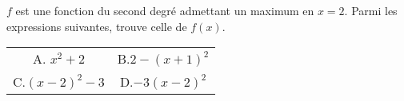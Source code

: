 
$f$ est une fonction du second degré admettant un maximum en $x=2$. Parmi les expressions suivantes, trouve celle de $f(x)$.

\begin{tabular}{cc}
A. $x^2+2$ & B.$2-(x+1)^2$  \\ 
C.$(x-2)^2-3$ & D.$-3(x-2)^2$ \\ 
\end{tabular} 